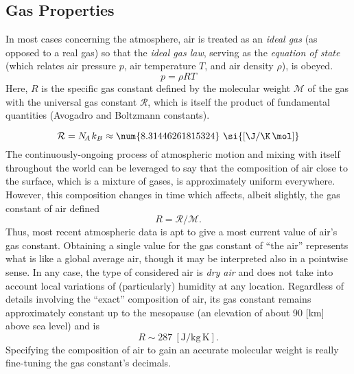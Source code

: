 \documentclass[11pt,dvipsnames]{thesis}
\begin{document}
\subsection{Gas Properties}
In most cases concerning the atmosphere, air is treated as an \textit{ideal gas} (as opposed to a real gas) so that the \textit{ideal gas law}, serving as the \textit{equation of state} (which relates air pressure $p$, air temperature $T$, and air density $\rho$), is obeyed.
\begin{equation}
p = \rho R T \label{eq:IdealGasLaw}
\end{equation}
Here, $R$ is the specific gas constant defined by the molecular weight $\mathcal{M}$ of the gas with the universal gas constant $\mathcal{R}$, which is itself the product of fundamental quantities (Avogadro and Boltzmann constants).

\begin{equation}
\mathcal{R} = N_{\!A} \hspace{0.225ex} k_B \approx \num{8.31446261815324}\ \si{[\J / \K \,\mol]}
\end{equation}
The continuously-ongoing process of atmospheric motion and mixing with itself throughout the world can be leveraged to say that the composition of air close to the surface, which is a mixture of gases, is approximately uniform everywhere. However, this composition changes in time
which affects, albeit slightly, the gas constant of air defined
\begin{equation}
R = \mathcal{R} / \mathcal{M}. \label{eq:gasConstant}
\end{equation}
Thus, most recent atmospheric data is apt to give a most current value of air's gas constant. Obtaining a single value for the gas constant of ``the air'' represents what is like a global average air, though it may be interpreted also in a pointwise sense. In any case, the type of considered air is \textit{dry air} and does not take into account local variations of (particularly) humidity at any location. Regardless of details involving the ``exact'' composition of air, its gas constant remains approximately constant up to the mesopause (an elevation of about 90 [\si{\km}] above sea level) and is
\begin{equation}
R \sim 287 \ [\si{\J / \kg\,\K}].
\end{equation}
Specifying the composition of air to gain an accurate molecular weight is really fine-tuning the gas constant's decimals.
\end{document}
